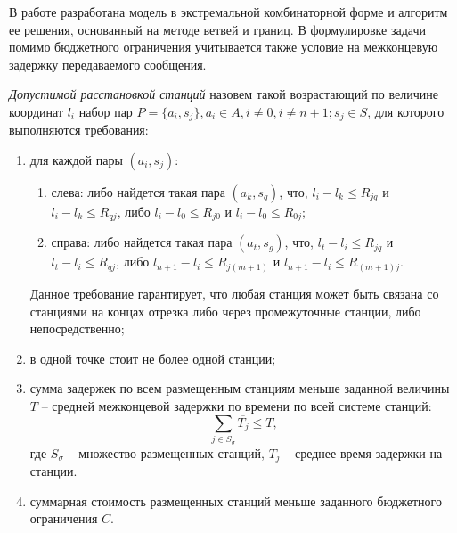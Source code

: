 

В работе разработана модель в экстремальной комбинаторной форме и алгоритм ее решения, основанный на методе ветвей и границ. В формулировке задачи помимо бюджетного ограничения учитывается также условие на межконцевую задержку передаваемого сообщения. 


\textit{Допустимой расстановкой станций} назовем такой возрастающий по величине координат $l_i$  набор пар $P = \{a_i, s_j\},a_i \in A,i \neq 0,i \neq n+1;s_j \in S$, для которого выполняются требования:

\begin{enumerate}
    \item  для каждой пары $(a_i,s_j)$:
        \begin{enumerate}
            \item слева: либо найдется такая пара $(a_k,s_q)$, что, $l_i - l_k \leqslant R_{jq}$  и $l_i - l_k  \leqslant R_{qj}$, либо $l_i-l_0 \leqslant R_{j0}$ и $l_i - l_0 \leqslant R_{0j}$;
            \item справа: либо найдется такая пара $(a_t,s_g)$, что, $l_t-l_i \leqslant R_{jq}$ и $l_t - l_i \leqslant R_{qj}$, либо $l_{n+1}-l_i \leqslant R_{j(m+1)}$ и $l_{n+1}-l_i \leqslant R_{(m+1)j}$. 
        \end{enumerate}

Данное требование гарантирует, что любая станция может быть связана со станциями на концах отрезка либо через промежуточные станции, либо непосредственно;
    \item в одной точке стоит не более одной станции;
    \item сумма задержек по всем размещенным станциям меньше заданной величины $T$ – средней межконцевой задержки по времени по всей системе станций:
    \begin{displaymath}
        \label{eq:part3_e2e_delay}
        \sum\limits_{j \in S_\sigma} \overline{T_j} \leqslant T,
    \end{displaymath}
где $S_\sigma$ – множество размещенных станций, $\overline{T_j}$ -- среднее время задержки на станции.
    \item суммарная стоимость размещенных станций меньше заданного бюджетного ограничения $C$.
\end{enumerate}

